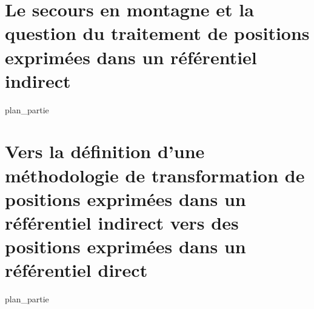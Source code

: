 \part{Le secours en montagne et la question du traitement de positions exprimées dans un référentiel indirect}
\label{part:01}
{plan_partie}
\part{Vers la définition d'une méthodologie de transformation de positions exprimées dans un référentiel indirect vers des positions exprimées dans un référentiel direct}
\label{part:02}
{plan_partie}

